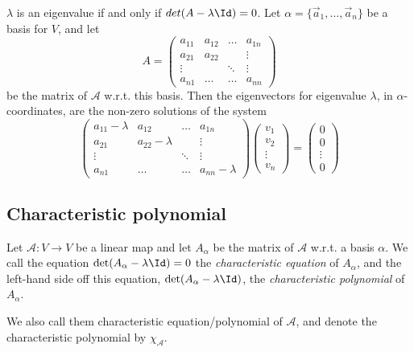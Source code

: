 \begin{theorem}
    $\lambda$ is an eigenvalue if and only if $det(A - \lambda \Id) = 0$. Let $\alpha = \{\vec{a}_1,\dots, \vec{a}_n\}$ be a basis for $V$, and let
    $$A = \begin{pmatrix} a_{11} & a_{12} & \dots & a_{1n} \\ a_{21}  & a_{22}  & & \vdots \\ \vdots & & \ddots & \vdots \\ a_{n1} & \dots & \dots & a_{nn} \end{pmatrix}$$
    be the matrix of $\mathcal{A}$ w.r.t. this basis. Then the eigenvectors for eigenvalue $\lambda$, in $\alpha$-coordinates, are the non-zero solutions of the system
    $$\begin{pmatrix} a_{11}-\lambda & a_{12} & \dots & a_{1n} \\ a_{21} & a_{22} - \lambda & & \vdots \\ \vdots & & \ddots & \vdots \\ a_{n1} & \dots & \dots & a_{nn} - \lambda \end{pmatrix}
    \begin{pmatrix} v_1 \\ v_2 \\ \vdots \\ v_n \end{pmatrix} = \begin{pmatrix} 0 \\ 0 \\ \vdots \\ 0 \end{pmatrix} $$
\end{theorem}

\subsection{Characteristic polynomial}
\begin{definition}
    Let $\mathcal{A}: V \to V$ be a linear map and let $A_\alpha$ be the matrix of $\mathcal{A}$ w.r.t. a basis $\alpha$. We call the equation $\det(A_\alpha - \lambda \Id) = 0$
    the \emph{characteristic equation} of $A_\alpha$, and the left-hand side off this equation, $\det(A_\alpha - \lambda \Id)$, the \emph{characteristic polynomial} of $A_\alpha$.
\end{definition}

We also call them characteristic equation/polynomial of $\mathcal{A}$, and denote the characteristic polynomial by $\chi_\mathcal{A}$.

